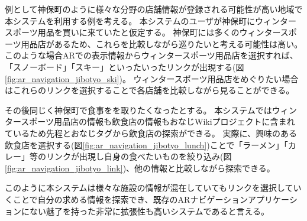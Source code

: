 例として神保町のように様々な分野の店舗情報が登録される可能性が高い地域で本システムを利用する例を考える。
本システムのユーザが神保町にウィンタースポーツ用品を買いに来ていたと仮定する。
神保町には多くのウィンタースポーツ用品店があるため、これらを比較しながら巡りたいと考える可能性は高い。
このような場合ARでの表示情報からウィンタースポーツ用品店を選択すれば、「スノーボード」「スキー」といったいったリンクが出現する(図\ref{fig:ar_navigation_jibotyo_ski})。
ウィンタースポーツ用品店をめぐりたい場合はこれらのリンクを選択することで各店舗を比較しながら見ることができる。

その後同じく神保町で食事をを取りたくなったとする。
本システムではウィンタースポーツ用品店の情報も飲食店の情報もおなじWikiプロジェクトに含まれているため先程とおなじタグから飲食店の探索ができる。
実際に、興味のある飲食店を選択する(図\ref{fig:ar_navigation_jibotyo_lunch})ことで「ラーメン」「カレー」等のリンクが出現し自身の食べたいものを絞り込み(図\ref{fig:ar_navigation_jibotyo_link})、他の情報と比較しながら探索できる。

このように本システムは様々な施設の情報が混在していてもリンクを選択していくことで自分の求める情報を探索でき、既存のARナビゲーションアプリケーションにない魅了を持った非常に拡張性も高いシステムであると言える。



